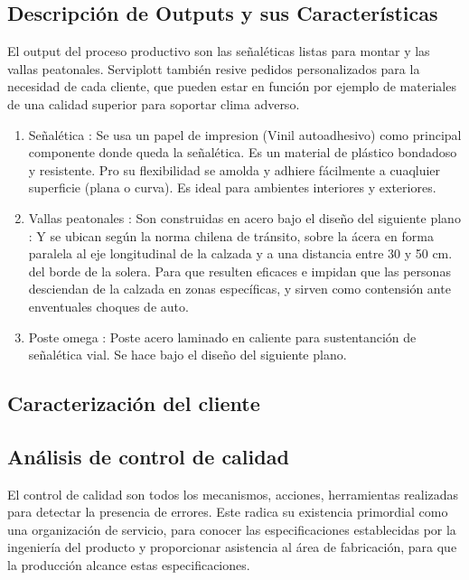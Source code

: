 	\subsection{Descripción de Outputs y sus Características}
	El output del proceso productivo son las señaléticas listas para montar y las vallas peatonales. Serviplott también resive pedidos personalizados para la necesidad de cada cliente, que pueden estar en función por ejemplo de materiales de una calidad superior para soportar clima adverso.
	\begin{enumerate}[1)]
	\item Señalética : Se usa un papel de impresion (Vinil autoadhesivo) como principal componente donde queda la señalética. Es un material de plástico bondadoso y resistente. Pro su flexibilidad se amolda y adhiere fácilmente a cuaqluier superficie (plana o curva). Es ideal para ambientes interiores y exteriores.
	\item Vallas peatonales : Son construidas en acero bajo el diseño del siguiente plano : 
	Y se ubican según la norma chilena de tránsito, sobre la ácera en forma paralela al eje longitudinal de la calzada y a una distancia entre 30 y 50 cm. del borde de la solera. Para que resulten eficaces e impidan que las personas desciendan de la calzada en zonas específicas, y sirven como contensión ante enventuales choques de auto.
	\item Poste omega : Poste acero laminado en caliente para sustentanción de señalética vial. Se hace bajo el diseño del siguiente plano.
	\end{enumerate}
	\subsection{Caracterización del cliente}
    	
	
	\subsection{Análisis de control de calidad}
		El control de calidad son todos los mecanismos, acciones, herramientas realizadas para detectar la presencia de errores. Este radica su existencia primordial como una organización de servicio, para conocer las especificaciones establecidas por la ingeniería del producto y proporcionar asistencia al área de fabricación, para que la producción alcance estas especificaciones.	

